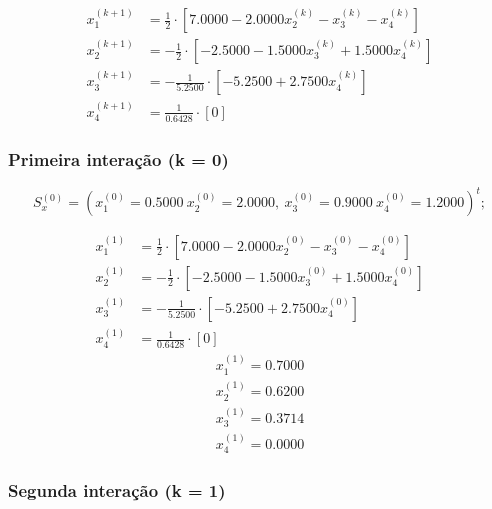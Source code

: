 \documentclass[12pt,a4paper]{article}
\begin{document}
                \begin{align*}
                    x_1^{(k+1)} &= \frac{1}{2} \cdot [7.0000 - 2.0000x_2^{(k)} - x_3^{(k)} - x_4^{(k)}]\\
                    x_2^{(k+1)} &= -\frac{1}{2} \cdot [-2.5000 - 1.5000x_3^{(k)} + 1.5000x_4^{(k)}]\\
                    x_3^{(k+1)} &= -\frac{1}{5.2500} \cdot [-5.2500 + 2.7500x_4^{(k)}]\\
                    x_4^{(k+1)} &= \frac{1}{0.6428} \cdot [0]
                \end{align*}

            \subsubsection{Primeira interação (k = 0)}

                \[
                S_x^{(0)} = (x_1^{(0)} = 0.5000\ x_2^{(0)}= 2.0000,\ x_3^{(0)}= 0.9000\ x_4^{(0)}= 1.2000)^t;
                \]

                \begin{align*}
                    x_1^{(1)} &= \frac{1}{2} \cdot [7.0000 - 2.0000x_2^{(0)} - x_3^{(0)} - x_4^{(0)}]\\
                    x_2^{(1)} &= -\frac{1}{2} \cdot [-2.5000 - 1.5000x_3^{(0)} + 1.5000x_4^{(0)}]\\
                    x_3^{(1)} &= -\frac{1}{5.2500} \cdot [-5.2500 + 2.7500x_4^{(0)}]\\
                    x_4^{(1)} &= \frac{1}{0.6428} \cdot [0]
                \end{align*}
                \begin{align*}
                    x_1^{(1)} = 0.7000\\ x_2^{(1)}= 0.6200\\ x_3^{(1)}= 0.3714\\ x_4^{(1)}= 0.0000
                \end{align*}

            \subsubsection{Segunda interação (k = 1)}
\end{document}
